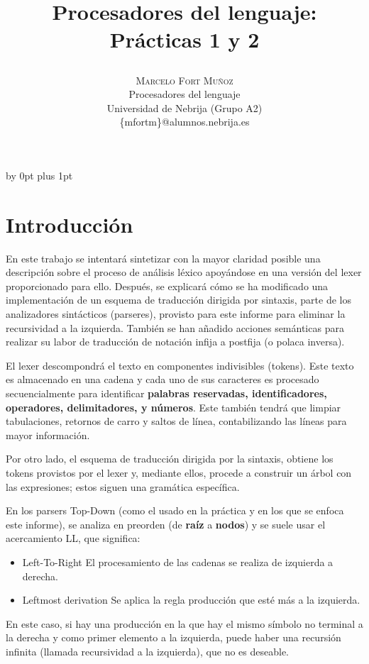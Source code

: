\documentclass[a4paper,twocolumn]{article}
\title{
    \begin{center}
        \huge\bfseries Procesadores del lenguaje: Prácticas 1 y 2
    \end{center}
} %
\author{%
    \begin{center}
        \large\centering\textsc{Marcelo Fort Muñoz} \\[1ex] %
        \normalsize Procesadores del lenguaje \\[0.25ex]
        \normalsize Universidad de Nebrija (Grupo A2) \\[0.25ex] %
        \normalsize \{mfortm\}@alumnos.nebrija.es %
    \end{center}
}
\date{\begin{center}
          \large\today\\[2.5ex]
\end{center}} %
\begin{document}
    \maketitle

    \baselineskip \advance\parskip by 0pt plus 1pt


    \section{Introducción}\label{sec:introduccion}

    En este trabajo se intentará sintetizar con la mayor claridad posible una descripción sobre el proceso de análisis léxico apoyándose en una versión del lexer proporcionado para ello\cite{codigos}.
    Después, se explicará cómo se ha modificado una implementación de un esquema de traducción dirigida por sintaxis, parte de los analizadores sintácticos (parseres), provisto para este informe para eliminar la recursividad a la izquierda.
    También se han añadido acciones semánticas para realizar su labor de traducción de notación infija a postfija (o polaca inversa).

    El lexer descompondrá el texto en componentes indivisibles (tokens).
    Este texto es almacenado en una cadena y cada uno de sus caracteres es procesado secuencialmente para identificar \textbf{palabras reservadas, identificadores, operadores, delimitadores, y números}.
    Este también tendrá que limpiar tabulaciones, retornos de carro y saltos de línea, contabilizando las líneas para mayor información.

    Por otro lado, el esquema de traducción dirigida por la sintaxis, obtiene los tokens provistos por el lexer y, mediante ellos, procede a construir un árbol con las expresiones; estos siguen una gramática específica.


    En los parsers Top-Down (como el usado en la práctica y en los que se enfoca este informe), se analiza en preorden (de \textbf{raíz} a \textbf{nodos}) y se suele usar el acercamiento LL, que significa:
    \begin{itemize}
        \item{Left-To-Right} El procesamiento de las cadenas se realiza de izquierda a derecha.
        \item{Leftmost derivation}
        Se aplica la regla producción que esté más a la izquierda.
    \end{itemize}En este caso, si hay una producción en la que hay el mismo símbolo no terminal a la derecha y como primer elemento a la izquierda, puede haber una recursión infinita (llamada recursividad a la izquierda), que no es deseable.
\end{document}
